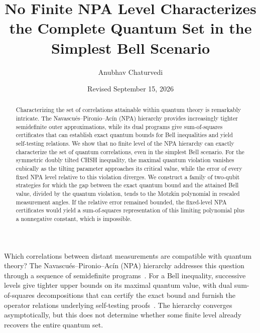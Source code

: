 \documentclass[aps,prl,twocolumn,10pt,superscriptaddress,nofootinbib,longbibliography,nobalancelastpage]{revtex4-2}
\begin{document}
\title{No Finite NPA Level Characterizes the Complete Quantum Set in the Simplest Bell Scenario}
\author{Anubhav Chaturvedi}
\date{Revised September 15, 2026}
\begin{abstract}
Characterizing the set of correlations attainable within quantum theory is remarkably intricate. The Navascués–Pironio–Acín (NPA) hierarchy provides increasingly tighter semidefinite outer approximations, while its dual programs give sum-of-squares certificates that can establish exact quantum bounds for Bell inequalities and yield self-testing relations. We show that no finite level of the NPA hierarchy can exactly characterize the set of quantum correlations, even in the simplest Bell scenario. For the symmetric doubly tilted CHSH inequality, the maximal quantum violation vanishes cubically as the tilting parameter approaches its critical value, while the error of every fixed NPA level relative to this violation diverges. We construct a family of two-qubit strategies for which the gap between the exact quantum bound and the attained Bell value, divided by the quantum violation, tends to the Motzkin polynomial in rescaled measurement angles. If the relative error remained bounded, the fixed-level NPA certificates would yield a sum-of-squares representation of this limiting polynomial plus a nonnegative constant, which is impossible.
\end{abstract}
\maketitle

Which correlations between distant measurements are compatible with quantum theory? The Navascu\'es--Pironio--Ac\'in (NPA) hierarchy addresses this question through a sequence of semidefinite programs~\cite{NPA2007,NPA2008,Tavakoli2024}. For a Bell inequality, successive levels give tighter upper bounds on its maximal quantum value, with dual sum-of-squares decompositions that can certify the exact bound and furnish the operator relations underlying self-testing proofs~\cite{BampsPironio2015,SupicBowles2020}. The hierarchy converges asymptotically, but this does not determine whether some finite level already recovers the entire quantum set.
\end{document}
